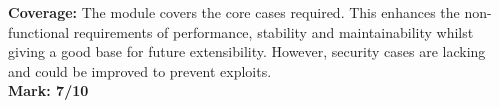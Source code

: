         \item \textbf{Coverage:}
				The module covers the core cases required.
				This enhances the non-functional requirements of performance, stability
				and maintainability whilst giving a good base for future extensibility.
				However, security cases are lacking and could be improved to prevent exploits.\\
				\textbf{Mark: 7/10}